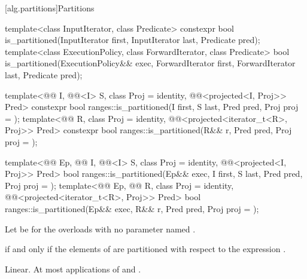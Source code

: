 [alg.partitions]{Partitions}

%
\begin{itemdecl}
template<class InputIterator, class Predicate>
  constexpr bool is_partitioned(InputIterator first, InputIterator last, Predicate pred);
template<class ExecutionPolicy, class ForwardIterator, class Predicate>
  bool is_partitioned(ExecutionPolicy&& exec,
                      ForwardIterator first, ForwardIterator last, Predicate pred);

template<@@ I, @@<I> S, class Proj = identity,
         @@<projected<I, Proj>> Pred>
  constexpr bool ranges::is_partitioned(I first, S last, Pred pred, Proj proj = {});
template<@@ R, class Proj = identity,
         @@<projected<iterator_t<R>, Proj>> Pred>
  constexpr bool ranges::is_partitioned(R&& r, Pred pred, Proj proj = {});

template<@@ Ep, @@ I, @@<I> S,
         class Proj = identity, @@<projected<I, Proj>> Pred>
  bool ranges::is_partitioned(Ep&& exec, I first, S last, Pred pred, Proj proj = {});
template<@@ Ep, @@ R, class Proj = identity,
         @@<projected<iterator_t<R>, Proj>> Pred>
  bool ranges::is_partitioned(Ep&& exec, R&& r, Pred pred, Proj proj = {});
\end{itemdecl}

\begin{itemdescr}
\pnum
Let  be 
for the overloads with no parameter named .

\pnum
\returns
{} if and only if the elements  of 
are partitioned with respect to the expression
.

\pnum
\complexity
Linear.
At most  applications of  and .
\end{itemdescr}

